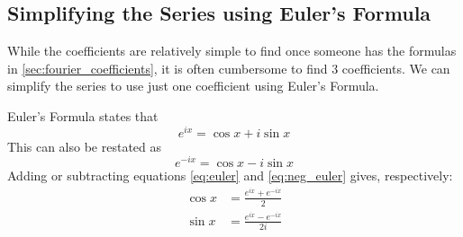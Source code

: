 \documentclass [12pt, titlepage]{article}
\numberwithin{equation}{section}
\begin{document}
\subsection{Simplifying the Series using Euler's Formula}

While the coefficients are relatively simple to find once someone has the formulas in
\autoref{sec:fourier_coefficients}, it is often cumbersome to find 3 coefficients. We can
simplify the series to use just one coefficient using Euler's Formula.

Euler's Formula states that
%
\begin{equation} \label{eq:euler}
    e^{ix} = \cos{x} + i\sin{x}
\end{equation}
%
This can also be restated as 
%
\begin{equation} \label{eq:neg_euler}
    e^{-ix} = \cos{x} - i\sin{x}
\end{equation}
%
Adding or subtracting equations \eqref{eq:euler} and \eqref{eq:neg_euler} gives,
respectively:
%
\begin{align*}
    \cos{x} &= \frac{e^{ix} + e^{-ix}}{2} \label{eq:euler_cos}\\ 
    \sin{x} &= \frac{e^{ix} - e^{-ix}}{2i} \label{eq:euler_sin}
\end{align*}
%
\end{document}
